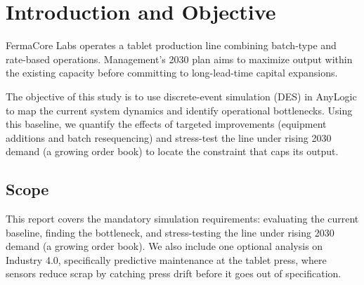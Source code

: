 \section{Introduction and Objective}
\label{sec:intro}

FermaCore Labs operates a tablet production line combining batch-type and rate-based operations. Management's 2030 plan aims to maximize output within the existing capacity before committing to long-lead-time capital expansions. 

The objective of this study is to use discrete-event simulation (DES) in AnyLogic to map the current system dynamics and identify operational bottlenecks. Using this baseline, we quantify the effects of targeted improvements (equipment additions and batch resequencing) and stress-test the line under rising 2030 demand (a growing order book) to locate the constraint that caps its output.

\subsection*{Scope}
This report covers the mandatory simulation requirements: evaluating the current baseline, finding the bottleneck, and stress-testing the line under rising 2030 demand (a growing order book). We also include one optional analysis on Industry 4.0, specifically predictive maintenance at the tablet press, where sensors reduce scrap by catching press drift before it goes out of specification.